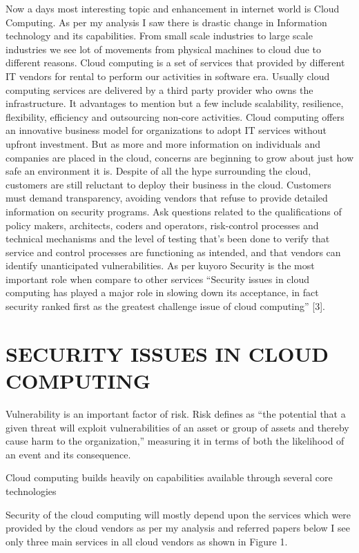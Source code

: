 \documentclass[conference]{IEEEtran}
\begin{document}
Now a days most interesting topic and enhancement in internet world is Cloud Computing. As per my analysis I saw there is drastic change in Information technology and its capabilities. From small scale industries to large scale industries we see lot of movements from physical machines to cloud due to different reasons. Cloud computing is a set of services that provided by different IT vendors for rental to perform our activities in software era. Usually cloud computing services are delivered by a third party provider who owns the infrastructure. It advantages to mention but a few include scalability, resilience, flexibility, efficiency and outsourcing non-core activities. Cloud computing offers an innovative business model for organizations to adopt IT services without upfront investment. But as more and more information on individuals and companies are placed in the cloud, concerns are beginning to grow about just how safe an environment it is. Despite of all the hype surrounding the cloud, customers are still reluctant to deploy their business in the cloud. Customers must demand transparency, avoiding vendors that refuse to provide detailed information on security programs. Ask questions related to the qualifications of policy makers, architects, coders and operators, risk-control processes and technical mechanisms and the level of testing that's been done to verify that service and control processes are functioning as intended, and that vendors can identify unanticipated vulnerabilities. As per kuyoro Security is the most important role when compare to other services “Security issues in cloud computing has played a major role in slowing down its acceptance, in fact security ranked first as the greatest challenge issue of cloud computing” [3].


\section{SECURITY ISSUES IN CLOUD COMPUTING}

Vulnerability is an important factor of risk. Risk defines as “the potential that a given threat will exploit vulnerabilities of an asset or group of assets and thereby cause harm to the organization,” measuring it in terms of both the likelihood of an event and its consequence.

Cloud computing builds heavily on capabilities available through several core technologies

Security of the cloud computing will mostly depend upon the services which were provided by the cloud vendors as per my analysis and referred papers below I see only three main services in all cloud vendors as shown in Figure 1.
\end{document}
